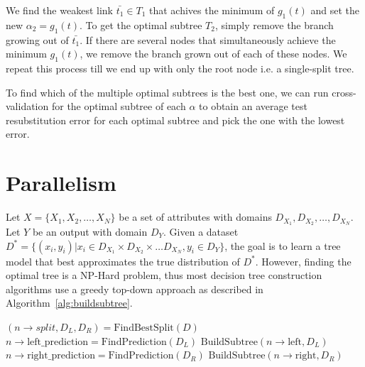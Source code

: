 We find the weakest link $\bar{t_1} \in T_1$ that achives the minimum of
$g_1(t)$  and set the new $\alpha_2 = g_1(t)$. To get the optimal subtree $T_2$,
simply remove the branch growing out of $\bar{t_1}$. If there are several nodes
that simultaneously achieve the minimum $g_1(t)$, we remove the branch grown out of
each of these nodes. We repeat this process till we end up with only the root
node i.e. a single-split tree.

To find which of the multiple optimal subtrees is the best one, we can run
cross-validation for the optimal subtree of each $\alpha$ to obtain an average
test resubstitution error for each optimal subtree and pick the one with the
lowest error.


\section{Parallelism} %
\label{sec:parallelism}

Let $X = \{X_1, X_2, \dots, X_N\}$ be a set of attributes with domains
$D_{X_1}, D_{X_2}, \dots, D_{X_N}$. Let $Y$ be an output with domain $D_Y$.
Given a dataset $D^* = \{(x_i, y_i) | x_i \in D_{X_1} \times D_{X_2} \times \dots D_{X_N}, y_i \in D_Y\}$,
the goal is to learn a tree model that best approximates the true
distribution of $D^*$. However, finding the optimal tree is a NP-Hard problem,
thus most decision tree construction algorithms use a greedy top-down approach
as described in Algorithm~\ref{alg:buildsubtree}.

\begin{algorithm}[BuildSubtree$(n, D)$] \label{alg:buildsubtree}
\begin{algorithmic}[1]
    \State $\left(n \rightarrow split, D_L, D_R \right) = \text{FindBestSplit}(D)$
        \State $n \rightarrow \text{left\_prediction} = \text{FindPrediction}(D_L)$
    \Else
        \State $\text{BuildSubtree}(n \rightarrow \text{left}, D_L)$
    \EndIf
        \State $n \rightarrow \text{right\_prediction} = \text{FindPrediction}(D_R)$
    \Else
        \State $\text{BuildSubtree}(n \rightarrow \text{right}, D_R)$
    \EndIf
\end{algorithmic}
\end{algorithm}

